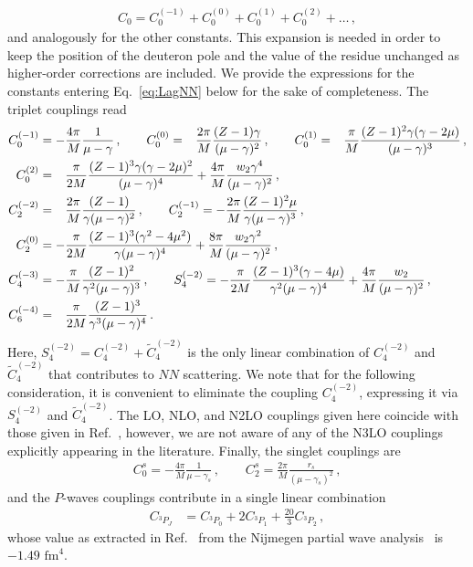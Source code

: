 \documentclass[prl,
twocolumn,
showpacs,preprintnumbers,amsmath,amssymb,
superscriptaddress,
a4paper,nofootinbib,longbibliography]{revtex4-2}
\def\hpm{\hphantom{-}}
\begin{document}
\begin{align}
    C_{0} = C_0^{(-1)} + C_0^{(0)} + C_0^{(1)} + C_0^{(2)} + \dots\,,
\end{align}
and analogously for the other constants. This expansion is needed in order to keep the position of the deuteron pole and the value of the residue unchanged as higher-order corrections are included. We provide the expressions for the constants entering Eq.~\eqref{eq:LagNN} below for the sake of completeness. The triplet couplings read
\begin{align}
    C_{0}^{(-1)} & = - \frac{4\pi}{M}\frac{1}{\mu-\gamma}\,,\qquad
    C_0^{(0)} =\hpm \frac{2\pi}{M}\frac{(Z-1)\gamma}{(\mu-\gamma)^2}\,,\qquad
    C_0^{(1)} =\hpm \frac{\pi}{M}\frac{(Z-1)^2\gamma(\gamma-2\mu)}{(\mu-\gamma)^3}\,,\nonumber\\
    C_0^{(2)} &=\hpm \frac{\pi}{2M}\frac{(Z-1)^3\gamma(\gamma-2\mu)^2}{(\mu-\gamma)^4}
    +\frac{4\pi}{M}\frac{w_2\gamma^4}{(\mu-\gamma)^2}    \,, \nonumber \\
    C_{2}^{(-2)} & =\hpm \frac{2\pi}{M}\frac{(Z-1)}{\gamma(\mu-\gamma)^2}\,, \qquad
    C_2^{(-1)}=-\frac{2\pi}{M}\frac{(Z-1)^2\mu}{\gamma(\mu-\gamma)^3}\,, \nonumber \\
    C_2^{(0)}&=-\frac{\pi}{2M}\frac{(Z-1)^3(\gamma^2-4\mu^2)}{\gamma(\mu-\gamma)^4}
    +\frac{8\pi}{M}\frac{w_2\gamma^2}{(\mu-\gamma)^2}   \,,\nonumber \\
    C_4^{(-3)} &= -\frac{\pi}{M}\frac{(Z-1)^2}{\gamma^2(\mu-\gamma)^3}\,, \qquad
    S_4^{(-2)} =- \frac{\pi}{2M}\frac{(Z-1)^3(\gamma-4\mu)}{\gamma^2(\mu-\gamma)^4}+\frac{4\pi}{M}\frac{w_2}{(\mu-\gamma)^2}\,, \nonumber \\
    C_6^{(-4)} &=\hpm \frac{\pi}{2M}\frac{(Z-1)^3}{\gamma^3(\mu-\gamma)^4}\,.
\end{align}
Here, $S_4^{(-2)}=C_4^{(-2)} + \tilde{C}_4^{(-2)}$ is the only linear combination of $C_4^{(-2)}$ and $\tilde{C}_4^{(-2)}$ that contributes to $NN$ scattering. We note that for the following consideration, it is convenient to eliminate the coupling $C_4^{(-2)}$, expressing it via $S_4^{(-2)}$ and $\tilde{C}_4^{(-2)}$. The LO, NLO, and N2LO couplings given here coincide with those given in Ref.~\cite{Phillips:1999hh}, however, we are not aware of any of the N3LO couplings explicitly appearing in the literature.
 Finally, the singlet couplings are
\begin{align}
 C_0^s =-\frac{4\pi}{M}\frac{1}{\mu - \gamma_s} \,, \qquad C_2^s = \frac{2\pi}{M}\frac{r_s}{(\mu-\gamma_s)^2}\,,
\end{align}
and the $P$-waves couplings contribute in a single linear combination
\begin{align}
    C_{{}^{3\!}P_J}&= C_{{}^{3\!}P_0}+2 C_{{}^{3\!}P_1}+\frac{20}{3} C_{{}^{3\!}P_2}\,,
\end{align}
whose value as extracted in Ref.~\cite{Chen:1999bg} from the Nijmegen partial wave analysis~\cite{Stoks:1993tb,Stoks:1994wp} is $-1.49\text{ fm}^4$.
\end{document}
